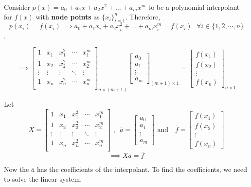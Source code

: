 \documentclass[
]{book}
\begin{document}
Consider \(p(x) = a_0+a_1x+a_2x^2+\dots+ a_mx^m\) to be a polynomial interpolant for \(f(x)\) with \textbf{node points} as \(\{x_i\}_{i=1}^n\). Therefore,
\[p(x_i)=f(x_i) \implies a_0+a_1x_i+a_2x_i^2+\dots+ a_mx_i^m = f(x_i) \ \ \ \forall i \in \{1,2,\cdots, n\}\].

\begin{equation}
\implies \begin{bmatrix}
1 & x_1 & x_1^2 & \cdots & x_1^m\\
1 & x_2 & x_2^2 & \cdots & x_2^m\\
\vdots & \vdots & \vdots & \ddots & \vdots \\
1 & x_n & x_n^2 & \cdots & x_n^m\\
\end{bmatrix}_{n \times(m+1)} \begin{bmatrix}a_0\\a_1\\ \vdots \\a_m \end{bmatrix}_{(m+1) \times 1}  = \begin{bmatrix} f(x_1)\\f(x_2)\\ \vdots \\f(x_n) \end{bmatrix}_{n\times 1}
\end{equation}

Let \[X = \begin{bmatrix}
1 & x_1 & x_1^2 & \cdots & x_1^m\\
1 & x_2 & x_2^2 & \cdots & x_2^m\\
\vdots & \vdots & \vdots & \ddots & \vdots \\
1 & x_n & x_n^2 & \cdots & x_n^m\\
\end{bmatrix}\text{ ,} \ \  \ \bar{a} = \begin{bmatrix}a_0\\a_1\\ \vdots \\a_m \end{bmatrix}  \text{ and } \ \ \ \bar{f}=  \begin{bmatrix} f(x_1)\\f(x_2)\\ \vdots \\f(x_n) \end{bmatrix}\]
\[\implies X\bar{a} = \bar{f}\]

Now the \(\bar{a}\) has the coefficients of the interpolant. To find the coefficients, we need to solve the linear system.
\end{document}
